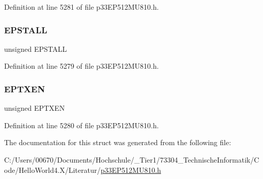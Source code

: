 Definition at line 5281 of file p33\+E\+P512\+M\+U810.\+h.

\mbox{\label{structtag_u1_e_p14_b_i_t_s_a47042104f04ebe06a23f9789bd400d7e}} 
\subsubsection{\texorpdfstring{E\+P\+S\+T\+A\+LL}{EPSTALL}}
{\footnotesize\ttfamily unsigned E\+P\+S\+T\+A\+LL}



Definition at line 5279 of file p33\+E\+P512\+M\+U810.\+h.

\mbox{\label{structtag_u1_e_p14_b_i_t_s_aa2d88c1be513e759c136823c86a355b4}} 
\subsubsection{\texorpdfstring{E\+P\+T\+X\+EN}{EPTXEN}}
{\footnotesize\ttfamily unsigned E\+P\+T\+X\+EN}



Definition at line 5280 of file p33\+E\+P512\+M\+U810.\+h.



The documentation for this struct was generated from the following file\+:\begin{DoxyCompactItemize}
\item 
C\+:/\+Users/00670/\+Documents/\+Hochschule/\+\_\+\+Tier1/73304\+\_\+\+Technische\+Informatik/\+Code/\+Hello\+World4.\+X/\+Literatur/\hyperlink{p33_e_p512_m_u810_8h}{p33\+E\+P512\+M\+U810.\+h}\end{DoxyCompactItemize}
